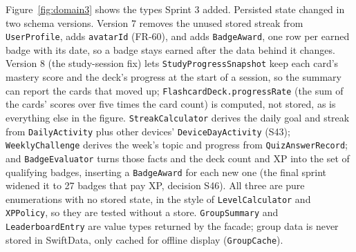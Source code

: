 \documentclass[12pt,letterpaper]{article}
\begin{document}
Figure~\ref{fig:domain3} shows the types Sprint 3 added. Persisted state changed
in two schema versions. Version 7 removes the unused stored streak from
\texttt{UserProfile}, adds \texttt{avatarId} (FR-60), and adds \texttt{BadgeAward}, one
row per earned badge with its date, so a badge stays earned after the data behind it
changes. Version 8 (the study-session fix) lets \texttt{StudyProgressSnapshot} keep
each card's mastery score and the deck's progress at the start of a session, so the
summary can report the cards that moved up; \texttt{FlashcardDeck.progressRate} (the
sum of the cards' scores over five times the card count) is computed, not stored, as
is everything else in the figure. \texttt{StreakCalculator} derives the daily goal
and streak from \texttt{DailyActivity} plus other devices' \texttt{DeviceDayActivity} (S43); \texttt{WeeklyChallenge} derives the week's
topic and progress from \texttt{QuizAnswerRecord}; and \texttt{BadgeEvaluator} turns
those facts and the deck count and XP into the set of qualifying badges, inserting a
\texttt{BadgeAward} for each new one (the final sprint widened it to 27 badges that pay XP, decision S46). All three are pure enumerations with no stored
state, in the style of \texttt{LevelCalculator} and \texttt{XPPolicy}, so they are
tested without a store. \texttt{GroupSummary} and \texttt{LeaderboardEntry} are value
types returned by the facade; group data is never stored in SwiftData, only cached for
offline display (\texttt{GroupCache}).
\end{document}
